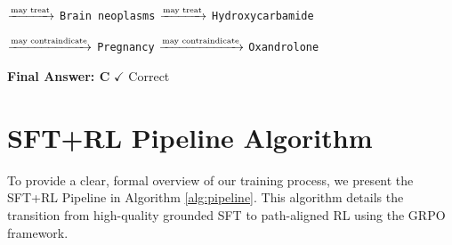 \documentclass{article}
\theoremstyle{plain}
\theoremstyle{definition}
\theoremstyle{remark}
\begin{document}
\begin{tcolorbox}
\begin{tcolorbox}[
        colback=truepathback,
        colframe=green!50!black,
        boxrule=0.5pt,
        left=2mm, right=2mm, top=1.5mm, bottom=1.5mm
    ]
        \vspace{0.1cm}
        $\xrightarrow{\text{\tiny may treat}}$ 
        \colorbox{pathhighlight}{\texttt{Brain neoplasms}} 
        $\xrightarrow{\text{\tiny may treat}}$ 
        \colorbox{pathhighlight}{\texttt{Hydroxycarbamide}}
        
        \vspace{0.1cm}
        $\xrightarrow{\text{\tiny may contraindicate}}$ 
        \colorbox{pathhighlight}{\texttt{Pregnancy}} 
        $\xrightarrow{\text{\tiny may contraindicate}}$ 
        \colorbox{pathhighlight}{\texttt{Oxandrolone}}
    \end{tcolorbox}

    \vspace{0.1cm}
    \textbf{Final Answer: \color{medicalblue}C} \quad \textcolor{green!70!black}{$\checkmark$ Correct}
\end{tcolorbox}


\newpage
\section{SFT+RL Pipeline Algorithm}
\label{Appendix G}
To provide a clear, formal overview of our training process, we present the SFT+RL Pipeline in Algorithm \ref{alg:pipeline}. This algorithm details the transition from high-quality grounded SFT to path-aligned RL using the GRPO framework.
\end{document}

